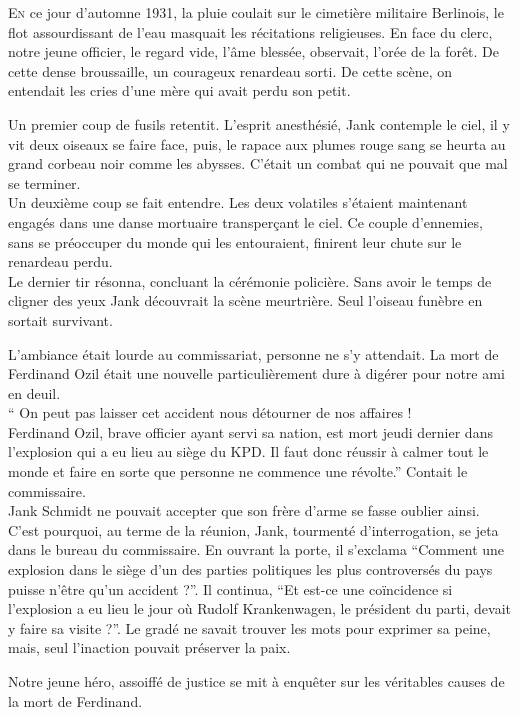 \lettrine{E}{n} ce jour d'automne 1931, la pluie coulait sur le cimetière militaire Berlinois,
le flot assourdissant de l'eau masquait les récitations religieuses.
En face du clerc, notre jeune officier, le regard vide, l'âme blessée, observait, l'orée de la forêt. 
De cette dense broussaille, un courageux renardeau sorti.
De cette scène, on entendait les cries d'une mère qui avait perdu son petit.

Un premier coup de fusils retentit.
L'esprit anesthésié, Jank contemple le ciel, il y vit deux oiseaux se faire face, puis, le rapace aux plumes rouge sang se heurta au grand corbeau noir comme les abysses.
C'était un combat qui ne pouvait que mal se terminer.\\
Un deuxième coup se fait entendre.
Les deux volatiles s'étaient maintenant engagés dans une danse mortuaire transperçant le ciel.
Ce couple d'ennemies, sans se préoccuper du monde qui les entouraient, finirent leur chute sur le renardeau perdu.\\
Le dernier tir résonna, concluant la cérémonie policière.
Sans avoir le temps de cligner des yeux Jank découvrait la scène meurtrière.
Seul l'oiseau funèbre en sortait survivant.

L'ambiance était lourde au commissariat, personne ne s'y attendait.
La mort de Ferdinand Ozil était une nouvelle particulièrement dure à digérer pour notre ami en deuil.\\
\enquote{%
    On peut pas laisser cet accident nous détourner de nos affaires !\\
    Ferdinand Ozil, brave officier ayant servi sa nation, est mort jeudi dernier dans l'explosion qui a eu lieu au siège du KPD.
    Il faut donc réussir à calmer tout le monde et faire en sorte que personne ne commence une révolte.}
Contait le commissaire.\\
Jank Schmidt ne pouvait accepter que son frère d'arme se fasse oublier ainsi.
C'est pourquoi, au terme de la réunion, Jank, tourmenté d'interrogation, se jeta dans le bureau du commissaire.
En ouvrant la porte, il s'exclama
\enquote{Comment une explosion dans le siège d'un des parties politiques les plus controversés du pays puisse n'être qu'un accident ?}.
Il continua,
\enquote{Et est-ce une coïncidence si l'explosion a eu lieu le jour où Rudolf Krankenwagen, le président du parti, devait y faire sa visite ?}.
Le gradé ne savait trouver les mots pour exprimer sa peine, mais, seul l'inaction pouvait préserver la paix.

Notre jeune héro, assoiffé de justice se mit à enquêter sur les véritables causes de la mort de Ferdinand.

